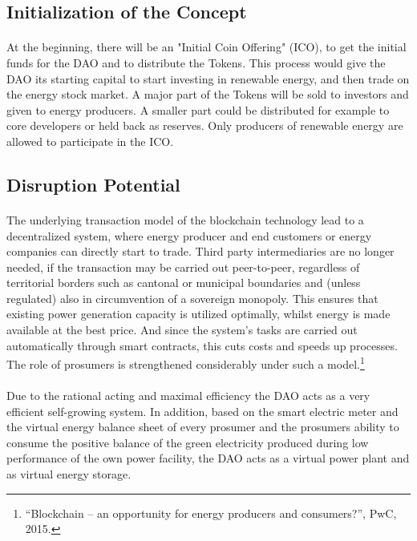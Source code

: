 \documentclass{scrartcl}
\begin{document}
	\subsection{Initialization of the Concept}
	
	\paragraph{}
	At the beginning, there will be an "Initial Coin Offering" (ICO), to get the initial funds for the DAO and to distribute the Tokens. This process would give the DAO its starting capital to start investing in renewable energy, and then trade on the energy stock market. A major part of the Tokens will be sold to investors and given to energy producers. A smaller part could be distributed for example to core developers or held back as reserves. Only producers of renewable energy are allowed to participate in the ICO.
	
	\subsection{Disruption Potential}
	
	\paragraph{}
	The underlying transaction model of the blockchain technology lead to a decentralized system, where energy producer and end customers or energy companies can directly start to trade. Third party intermediaries are no longer needed, if the transaction may be carried out peer-to-peer, regardless of territorial borders such as cantonal or municipal boundaries and (unless regulated) also in circumvention of a sovereign monopoly. This ensures that existing power generation capacity is utilized optimally, whilst energy is made available at the best price. And since the system's tasks are carried out automatically through smart contracts, this cuts costs and speeds up processes. The role of prosumers is strengthened considerably under such a model.\footnote{“Blockchain – an opportunity for energy producers and consumers?”, PwC, 2015.}
	
	\paragraph{}
	Due to the rational acting and maximal efficiency the DAO acts as a very efficient self-growing system. In addition, based on the smart electric meter and the virtual energy balance sheet of every prosumer and the prosumers ability to consume the positive balance of the green electricity produced during low performance of the own power facility, the DAO acts as a virtual power plant and as virtual energy storage.
	
\end{document}
